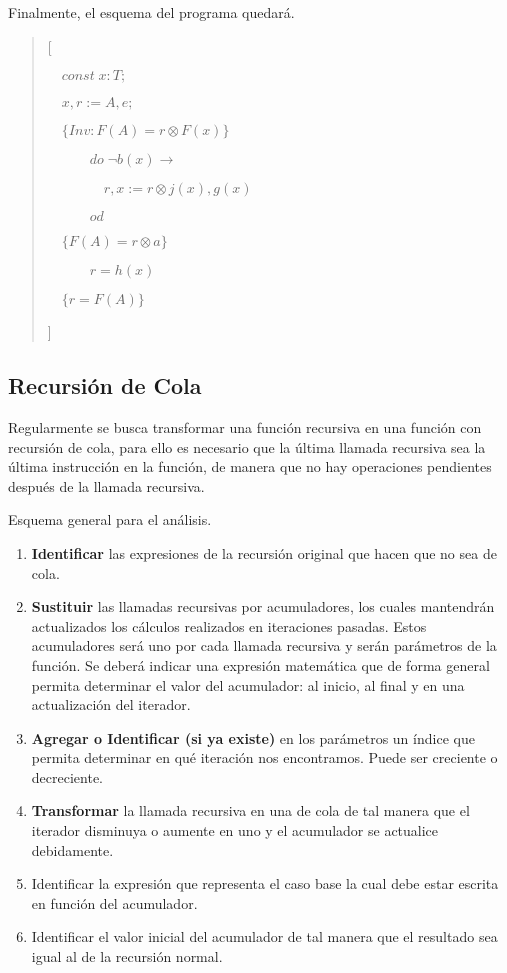 \documentclass[hidelinks]{article}
\newenvironment{absolutelynopagebreak}
{\Needspace{10\baselineskip}\begin{quote}}
		{\end{quote}}
\begin{document}
Finalmente, el esquema del programa quedará.\par

\begin{absolutelynopagebreak}
	[\par
		$\quad const \; x: T;$\par
		$\quad x, r := A, e;$\par
		$\quad \{Inv: F(A) = r \otimes F(x)\}$\par
		$\qquad \quad do \; \neg b(x) \rightarrow$ \par
		$\qquad \qquad r, x := r \otimes j(x), g(x)$ \par
		$\qquad \quad od$ \par
		$\quad \{ F(A) = r \otimes a\}$ \par
		$\qquad \quad r = h(x)$ \par
		$\quad \{r =F(A)\}$ \par
	]\par
\end{absolutelynopagebreak}\par

\subsection{Recursión de Cola}\par
Regularmente se busca transformar una función recursiva en una función con
recursión de cola, para ello es necesario que la última llamada recursiva sea
la última instrucción en la función, de manera que no hay operaciones
pendientes después de la llamada recursiva.\par

Esquema general para el análisis.\par

\begin{enumerate}
	\item \textbf{Identificar} las expresiones de la recursión original que hacen que no sea de cola.
	\item \textbf{Sustituir} las llamadas recursivas por acumuladores, los cuales mantendrán actualizados los cálculos realizados en iteraciones pasadas. Estos acumuladores será uno por cada llamada recursiva y serán parámetros de la función. Se deberá indicar una expresión matemática que de forma general permita determinar el valor del acumulador: al inicio, al final y en una actualización del iterador.
	\item \textbf{Agregar o Identificar (si ya existe)} en los parámetros un índice que permita determinar en qué iteración nos encontramos. Puede ser creciente o decreciente.
	\item \textbf{Transformar} la llamada recursiva en una de cola de tal manera que el iterador disminuya o aumente en uno y el acumulador se actualice debidamente.
	\item Identificar la expresión que representa el caso base la cual debe estar escrita
	      en función del acumulador.
	\item Identificar el valor inicial del acumulador de tal manera que el resultado sea
	      igual al de la recursión normal.
\end{enumerate}
\end{document}
